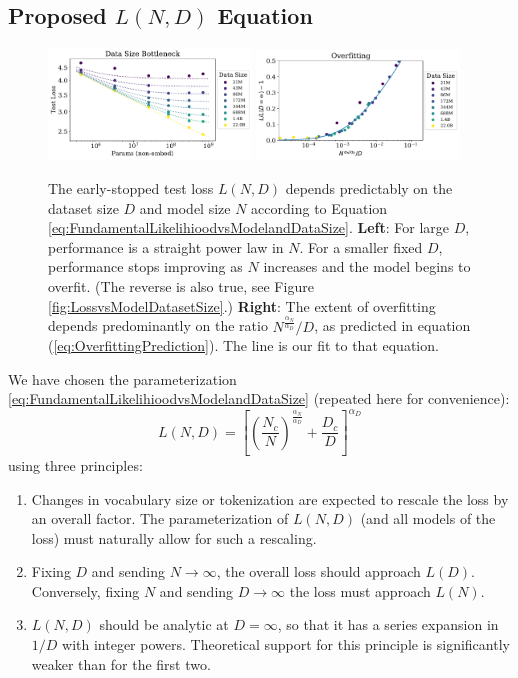 \documentclass[english]{article}
\newcommand{\be}{\begin{equation}}
\newcommand{\ee}{\end{equation}}
\begin{document}
\subsection{Proposed $L(N,D)$ Equation}

\begin{figure}
\noindent \centering{} 
\includegraphics[width=0.48\textwidth]{DatasetModelSizevsPerformance}\hfill
\includegraphics[width=0.48\textwidth]{DatasetModelSizevsChangePerformance}
\caption[Universality of overfitting]{
The early-stopped test loss $L(N, D)$ depends predictably on the dataset size $D$ and model size $N$ according to Equation \eqref{eq:FundamentalLikelihioodvsModelandDataSize}.
{\bf Left}:
For large $D$, performance is a straight power law in $N$. For a smaller fixed $D$, performance stops improving as $N$ increases and the model begins to overfit. (The reverse is also true, see Figure \ref{fig:LossvsModelDatasetSize}.)
{\bf Right}:  The extent of overfitting depends predominantly on the ratio $N^{\frac{\alpha_N}{\alpha_D}}/D$, as predicted in equation (\ref{eq:OverfittingPrediction}).  The line is our fit to that equation.
\label{fig:DatasetModelSizevsPerformance}}
\end{figure}

We have chosen the parameterization \eqref{eq:FundamentalLikelihioodvsModelandDataSize} (repeated here for convenience):
\be
L(N, D) 
= \left[ \left( \frac{N_c}{N} \right)^{\frac{\alpha_N}{\alpha_D}} + \frac{D_c}{D}  \right]^{\alpha_D}
\ee
using three principles:
\begin{enumerate}
\item Changes in vocabulary size or tokenization are expected to rescale the loss by an overall factor.  The parameterization of $L(N,D)$ (and all models of the loss) must naturally allow for such a rescaling.
\item Fixing $D$ and sending $N \to \infty$,  the overall loss should approach $L(D)$.  Conversely, fixing $N$ and sending $D \to \infty$ the loss must approach $L(N)$.
\item $L(N,D)$ should be analytic at $D=\infty$, so that it has a series expansion in $1/D$ with integer powers.  Theoretical support for this principle is significantly weaker than for the first two.
\end{enumerate}
\end{document}
